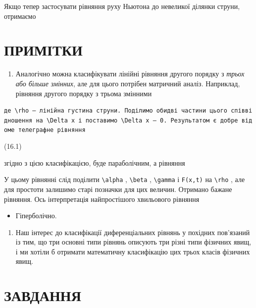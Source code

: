 \documentclass[
  ukrainian,
]{article}
\providecommand{\tightlist}{%
  \setlength{\itemsep}{0pt}\setlength{\parskip}{0pt}}
\begin{document}
Якщо тепер застосувати рівняння руху Ньютона до невеликої ділянки
струни, отримаємо

\section{ПРИМІТКИ}\label{ux43fux440ux438ux43cux456ux442ux43aux438-1}

\begin{enumerate}
\def\labelenumi{\arabic{enumi}.}
\tightlist
\item
  Аналогічно можна класифікувати лінійні рівняння другого порядку з
  \emph{трьох або більше змінних}, але для цього потрібен матричний
  аналіз. Наприклад, рівняння другого порядку з трьома змінними
\end{enumerate}

\texttt{де\ \textquotesingle{}\textbackslash{}rho\textquotesingle{}\ —\ лінійна\ густина\ струни.\ Поділимо\ обидві\ частини\ цього\ співвідношення\ на\ \textquotesingle{}\textbackslash{}Delta\ x\textquotesingle{}\ і\ поставимо\ \textquotesingle{}\textbackslash{}Delta\ x\textquotesingle{}\ —\ 0.\ Результатом\ є\ добре\ відоме\ телеграфне\ рівняння}

(16.1)

згідно з цією класифікацією, буде параболічним, а рівняння

У цьому рівнянні слід поділити \texttt{\textbackslash{}alpha} ,
\texttt{\textbackslash{}beta} , \texttt{\textbackslash{}gamma} і
\texttt{F(x,t)} на \texttt{\textbackslash{}rho} , але для простоти
залишимо старі позначки для цих величин. Отримано бажане рівняння. Ось
інтерпретація найпростішого хвильового рівняння

\begin{itemize}
\tightlist
\item
  Гіперболічно.
\end{itemize}

\begin{enumerate}
\def\labelenumi{\arabic{enumi}.}
\setcounter{enumi}{1}
\tightlist
\item
  Наш інтерес до класифікації диференціальних рівнянь у похідних
  пов'язаний із тим, що три основні типи рівнянь описують три різні типи
  фізичних явищ, і ми хотіли б отримати математичну класифікацію цих
  трьох класів фізичних явищ.
\end{enumerate}

\section{ЗАВДАННЯ}\label{ux437ux430ux432ux434ux430ux43dux43dux44f-2}
\end{document}
